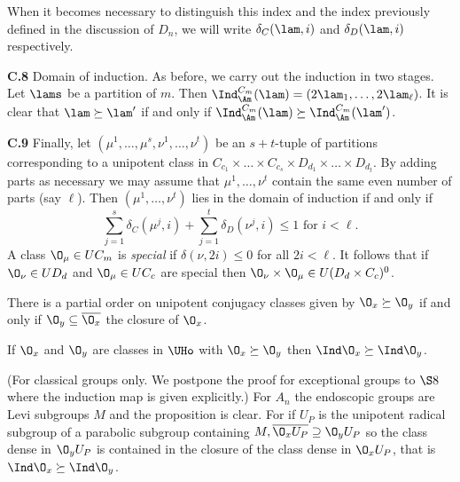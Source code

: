 When it becomes necessary to distinguish this index and the index previously
defined in the discussion of $D_n$, we will write $\delta_C(\lam,i)$ and
$\delta_D(\lam,i)$ respectively.

\noindent
{\bf C.8} \qquad Domain of induction.  As before, we carry out the 
induction in two stages.  Let $\lams$ be a partition of $m$.  
Then $\Ind_{{\Am}}^{C_m} (\lam) = (2\lam_1 ,\dots, 2\lam_\ell)$.  It is
clear that $\lam \succeq \lam'$ if and only if 
$\Ind_{{\Am}}^{C_m} (\lam) \succeq \Ind_{{\Am}}^{C_m} (\lam')$. 
	
\noindent
{\bf C.9} \qquad Finally, let 
$(\mu^1 ,\dots, \mu^s,\nu^1 ,\dots, \nu^t)$ be an $s+t$-tuple of 
partitions corresponding to a unipotent class in 
$C_{c_1} \times\dots\times C_{c_s} \times D_{d_1} \times\dots\times D_{d_t}$.
By adding
parts as necessary we may assume that $\mu^1 ,\dots, \nu^t$ contain the
same even number of parts (say $\ell$).  Then $(\mu^1 ,\dots, \nu^t)$ lies 
in the domain of induction if and only if 
	$$
	\sum_{j=1}^s \delta_C (\mu^j,i) +
	\sum_{j=1}^t \delta_D (\nu^j,i) \le 1 \text{ for } i < \ell.
	$$
A class $\O_\mu \in UC_m$ is {\it special\/} if
$\delta(\nu,2i) \le 0$ for all $2i < \ell$.  It follows that if
$\O_\nu \in UD_d$ and $\O_\mu \in UC_c$ are special then 
$\O_\nu \times \O_\mu \in U(D_d \times C_c)^0$.

\newpage


\bigskip

There is a partial order on unipotent conjugacy classes given by
$\O_x \succeq \O_y$ if and only if $\O_y \subseteq
\overline{\O_x}$ the 
closure of $\O_x$. 

 If $\O_x$ and $\O_y$ are classes in $\UHo$
with
     $\O_x \succeq \O_y$ then $\Ind \O_x \succeq \Ind \O_y$.
     \endproclaim

 (For classical groups only. We postpone the proof
for exceptional
     groups to $\S 8$ where the induction map is given
explicitly.)  For
     $A_n$ the endoscopic groups are Levi subgroups $M$ and the
proposition
     is clear.  For if $U_P$ is the unipotent radical subgroup of
a parabolic
     subgroup containing $M, \overline{\O_xU_P} \supseteq
\O_yU_P$ so the 
     class dense in $\O_yU_P$ is contained in the closure of the
class dense in
     $\O_xU_P$, that is $\Ind \O_x \succeq \Ind \O_y$.

